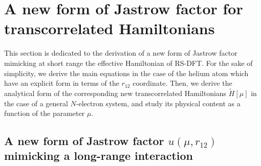 \documentclass[aip,jcp,reprint,noshowkeys,superscriptaddress]{revtex4-1}
\begin{document}
\section{A new form of Jastrow factor for transcorrelated Hamiltonians}
This section is dedicated to the derivation of a new form of Jastrow factor mimicking at short range the effective Hamiltonian of RS-DFT. 
For the sake of simplicity, we derive the main equations in the case of the helium atom which have an explicit form in terms of the $r_{12}$ coordinate. 
Then, we derive the analytical form of the corresponding new transcorrelated Hamiltonians $\tilde{H}[\mu]$ in the case of a general $N$-electron system, and study its physical content as a  function of the parameter $\mu$. 

\subsection{A new form of Jastrow factor $u(\mu,r_{12})$ mimicking a long-range interaction}
\label{sec:new_j}
\end{document}

